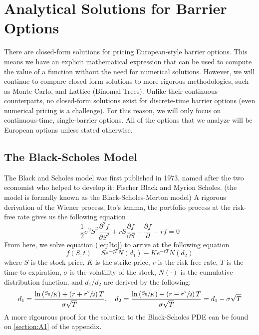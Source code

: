 %
\chapter{Analytical Solutions for Barrier Options}

There are closed-form solutions for pricing European-style barrier options. This means we have an explicit mathematical expression that can be used to compute the value of a function without the need for numerical solutions. However, we will continue to compare closed-form solutions to more rigorous methodologies, such as Monte Carlo, and Lattice (Binomal Trees). Unlike their continuous counterparts, no closed-form solutions exist for discrete-time barrier options (even numerical pricing is a challenge). For this reason, we will only focus on continuous-time, single-barrier options. All of the options that we analyze will be European options unless stated otherwise.

\section{The Black-Scholes Model}

The Black and Scholes model was first published in 1973, named after the two economist who helped to develop it: Fischer Black and Myrion Scholes. (the model is formally known as the Black-Scholes-Merton model) A rigorous derivation of the Wiener process, Ito's lemma, the portfolio process at the risk-free rate gives us the following equation
\begin{equation}\label{eq:Ito}
	\frac{1}{2}\sigma^2S^2\frac{\partial^2 f}{\partial S^2}+rS\frac{\partial f}{\partial S}-\frac{\partial f}{\partial }-rf=0
\end{equation}
From here, we solve equation (\ref{eq:Ito}) to arrive at the following equation
\begin{equation}\label{eq:bs_call_option}
	f(S,t)=Se^{-qT}N(d_1)-Ke^{-rT}N(d_2)
\end{equation}
where $S$ is the stock price, $K$ is the strike price, $r$ is the risk-free rate, $T$ is the time to expiration, $\sigma$ is the volatility of the stock, $N(\cdot)$ is the cumulative distribution function, and $d_1/d_2$ are derived by the following:
\begin{equation}
	d_1=\frac{\ln\left(\sfrac{S_0}{K}\right)+\left(r+\sfrac{\sigma^2}{2}\right)T}{\sigma\sqrt{T}},\quad d_2=\frac{\ln\left(\sfrac{S_0}{K}\right)+\left(r-\sfrac{\sigma^2}{2}\right)T}{\sigma\sqrt{T}}=d_1-\sigma\sqrt{T}
\end{equation}
A more rigourous proof for the solution to the Black-Scholes PDE can be found on \ref{section:A1} of the appendix.

